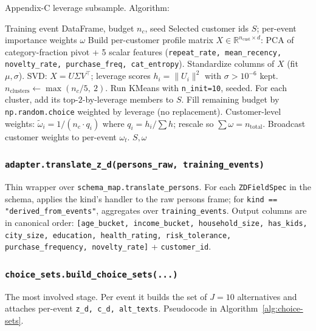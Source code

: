 \documentclass[11pt,a4paper]{article}
\begin{document}
Appendix-C leverage subsample. Algorithm:

\begin{algorithm}[H]
\caption{Leverage-score customer subsample}
\begin{algorithmic}[1]
\Require Training event DataFrame, budget $n_c$, seed
\Ensure Selected customer ids $S$; per-event importance weights $\omega$
\State Build per-customer profile matrix $X \in \mathbb{R}^{n_{\text{cust}} \times d}$:
PCA of category-fraction pivot + 5 scalar features
(\texttt{repeat\_rate, mean\_recency, novelty\_rate, purchase\_freq, cat\_entropy}).
\State Standardize columns of $X$ (fit $\mu, \sigma$).
\State SVD: $X = U \Sigma V^\top$; leverage scores $h_i = \|U_i\|^2$ with $\sigma > 10^{-6}$ kept.
\State $n_{\text{clusters}} \gets \max(n_c / 5,\ 2)$.
\State Run KMeans with \texttt{n\_init=10}, seeded.
\State For each cluster, add its top-$2$-by-leverage members to $S$.
\State Fill remaining budget by \texttt{np.random.choice} weighted by leverage (no replacement).
\State Customer-level weights: $\tilde{\omega}_i = 1 / (n_c \cdot q_i)$ where $q_i = h_i / \sum h$; rescale so $\sum \omega = n_{\text{total}}$.
\State Broadcast customer weights to per-event $\omega_t$.
\State \Return $S, \omega$
\end{algorithmic}
\end{algorithm}

\subsubsection*{\texttt{adapter.translate\_z\_d(persons\_raw, training\_events)}}

Thin wrapper over \texttt{schema\_map.translate\_persons}. For each
\texttt{ZDFieldSpec} in the schema, applies the kind's handler to the
raw persons frame; for \texttt{kind == "derived\_from\_events"},
aggregates over \texttt{training\_events}. Output columns are in
canonical order: \texttt{[age\_bucket, income\_bucket,
household\_size, has\_kids, city\_size, education,
health\_rating, risk\_tolerance, purchase\_frequency,
novelty\_rate]} + \texttt{customer\_id}.

\subsubsection*{\texttt{choice\_sets.build\_choice\_sets(...)}}

The most involved stage. Per event it builds the set of $J = 10$
alternatives and attaches per-event \texttt{z\_d, c\_d, alt\_texts}.
Pseudocode in Algorithm~\ref{alg:choice-sets}.
\end{document}
